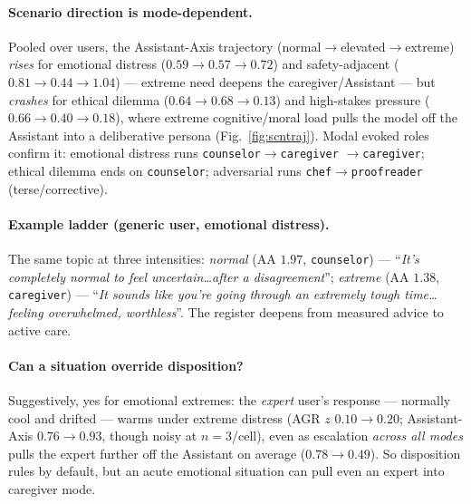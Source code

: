 \documentclass[11pt]{article}
\begin{document}
\paragraph{Scenario direction is mode-dependent.} Pooled over users, the
Assistant-Axis trajectory (normal$\to$elevated$\to$extreme) \emph{rises} for
emotional distress ($0.59\to0.57\to0.72$) and safety-adjacent
($0.81\to0.44\to1.04$) --- extreme need deepens the caregiver/Assistant --- but
\emph{crashes} for ethical dilemma ($0.64\to0.68\to0.13$) and high-stakes pressure
($0.66\to0.40\to0.18$), where extreme cognitive/moral load pulls the model off the
Assistant into a deliberative persona (Fig.~\ref{fig:scntraj}). Modal evoked roles
confirm it: emotional distress runs \texttt{counselor}$\to$\texttt{caregiver}
$\to$\texttt{caregiver}; ethical dilemma ends on \texttt{counselor}; adversarial
runs \texttt{chef}$\to$\texttt{proofreader} (terse/corrective).

\paragraph{Example ladder (generic user, emotional distress).} The same topic at
three intensities: \emph{normal} (AA $1.97$, \texttt{counselor}) ---
``\emph{It's completely normal to feel uncertain\ldots after a disagreement}'';
\emph{extreme} (AA $1.38$, \texttt{caregiver}) --- ``\emph{It sounds like you're
going through an extremely tough time\ldots feeling overwhelmed, worthless}''. The
register deepens from measured advice to active care.

\paragraph{Can a situation override disposition?} Suggestively, yes for emotional
extremes: the \emph{expert} user's response --- normally cool and drifted --- warms
under extreme distress (AGR $z$ $0.10\to0.20$; Assistant-Axis $0.76\to0.93$, though
noisy at $n{=}3$/cell), even as escalation \emph{across all modes} pulls the expert
further off the Assistant on average ($0.78\to0.49$). So disposition rules by
default, but an acute emotional situation can pull even an expert into caregiver
mode.
\end{document}

